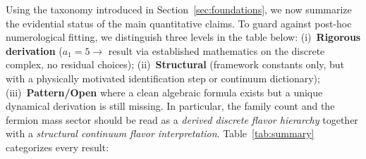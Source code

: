 \documentclass[12pt,a4paper]{article}
\theoremstyle{definition}
\begin{document}
Using the taxonomy introduced in Section~\ref{sec:foundations}, we now summarize the evidential status of the main quantitative claims.  To guard against post-hoc numerological fitting, we distinguish three levels in the table below: (i)~\textbf{Rigorous derivation} ($a_1 = 5 \to$ result via established mathematics on the discrete complex, no residual choices); (ii)~\textbf{Structural} (framework constants only, but with a physically motivated identification step or continuum dictionary); (iii)~\textbf{Pattern/Open} where a clean algebraic formula exists but a unique dynamical derivation is still missing.  In particular, the family count and the fermion mass sector should be read as a \emph{derived discrete flavor hierarchy} together with a \emph{structural continuum flavor interpretation}.  Table~\ref{tab:summary} categorizes every result:
\end{document}
